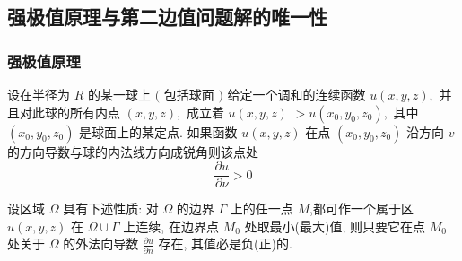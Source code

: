 \documentclass[10pt]{yerbaformat}
\begin{document}


\subsection{强极值原理与第二边值问题解的唯一性}
\subsubsection{强极值原理}


\begin{theorem}[强极值原理]
    设在半径为 $R$ 的某一球上 $($ 包括球面 $)$ 给定一个调和的连续函数 $u(x, y, z),$ 并且对此球的所有内点 $(x, y, z),$ 成立着 $u(x, y, z)$ $>u\left(x_{0}, y_{0}, z_{0}\right),$ 其中 $\left(x_{0}, y_{0}, z_{0}\right)$ 是球面上的某定点. 如果函数 $u(x, y, z)$ 在点 $(x_{0}, y_{0}, z_{0})$ 沿方向 $v$ 的方向导数与球的内法线方向成锐角则该点处
    $$
    \frac{\partial u}{\partial \nu}>0
    $$
\end{theorem}

\begin{theorem}\label{4.2}
    设区域 $\Omega$ 具有下述性质: 对 $\Omega$ 的边界 $\Gamma$ 上的任一点 $M$,都可作一个属于区 $u(x, y, z)$ 在 $\Omega \cup \Gamma$ 上连续, 在边界点 $M_{0}$ 处取最小(最大)值, 则只要它在点 $M_{0}$ 处关于 $\Omega$ 的外法向导数 $\frac{\partial u}{\partial n}$ 存在, 其值必是负(正)的.
\end{theorem}
\end{document}
